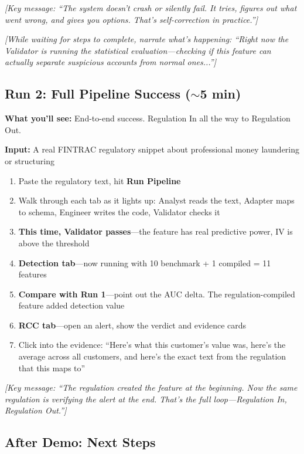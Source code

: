 \documentclass[11pt, a4paper]{article}
\newcommand{\note}[1]{\par{\small\color{note}\textit{[#1]}}\par}
\begin{document}
\note{Key message: ``The system doesn't crash or silently fail. It tries, figures out what went wrong, and gives you options. That's self-correction in practice.''}

\note{While waiting for steps to complete, narrate what's happening: ``Right now the Validator is running the statistical evaluation---checking if this feature can actually separate suspicious accounts from normal ones...''}

\subsection{Run 2: Full Pipeline Success ($\sim$5 min)}

\textbf{What you'll see:} End-to-end success. Regulation In all the way to Regulation Out.

\textbf{Input:} A real FINTRAC regulatory snippet about professional money laundering or structuring

\begin{enumerate}[leftmargin=1.5em, itemsep=0.3em]
  \item Paste the regulatory text, hit \textbf{Run Pipeline}
  \item Walk through each tab as it lights up: Analyst reads the text, Adapter maps to schema, Engineer writes the code, Validator checks it
  \item \textbf{This time, Validator passes}---the feature has real predictive power, IV is above the threshold
  \item \textbf{Detection tab}---now running with 10 benchmark + 1 compiled = 11 features
  \item \textbf{Compare with Run 1}---point out the AUC delta. The regulation-compiled feature added detection value
  \item \textbf{RCC tab}---open an alert, show the verdict and evidence cards
  \item Click into the evidence: ``Here's what this customer's value was, here's the average across all customers, and here's the exact text from the regulation that this maps to''
\end{enumerate}

\note{Key message: ``The regulation created the feature at the beginning. Now the same regulation is verifying the alert at the end. That's the full loop---Regulation In, Regulation Out.''}

\subsection{After Demo: Next Steps}
\end{document}

